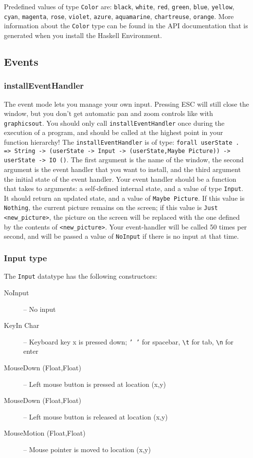 Predefined values of type \texttt{Color} are: \texttt{black}, \texttt{white}, \texttt{red}, \texttt{green}, \texttt{blue}, \texttt{yellow}, \texttt{cyan}, \texttt{magenta}, \texttt{rose}, \texttt{violet}, \texttt{azure}, \texttt{aquamarine}, \texttt{chartreuse}, \texttt{orange}.  
More information about the \texttt{Color} type can be found in the API documentation that is generated when you install the Haskell Environment.

\subsection{Events}
\subsubsection{installEventHandler}
The event mode lets you manage your own input. Pressing ESC will still close the window, but you don't get automatic pan and zoom controls like with \texttt{graphicsout}. You should only call \texttt{installEventHandler} once during the execution of a program, and should be called at the highest point in your function hierarchy! The \texttt{installEventHandler} is of type: \texttt{forall userState . => String -> (userState -> Input -> (userState,Maybe Picture)) -> userState -> IO ()}. The first argument is the name of the window, the second argument is the event handler that you want to install, and the third argument the initial state of the event handler. Your event handler should be a function that takes to arguments: a self-defined internal state, and a value of type \texttt{Input}. It should return an updated state, and a value of \texttt{Maybe Picture}. If this value is \texttt{Nothing}, the current picture remains on the screen; if this value is \verb!Just <new_picture>!, the picture on the screen will be replaced with the one defined by the contents of \verb!<new_picture>!. Your event-handler will be called 50 times per second, and will be passed a value of \texttt{NoInput} if there is no input at that time.

\subsubsection{Input type}
The \texttt{Input} datatype has the following constructors:
\begin{description}
  \item[NoInput] -- No input 
  \item[KeyIn Char] -- Keyboard key x is pressed down; \texttt{' '} for spacebar, \texttt{\textbackslash{}t} for tab, \texttt{\textbackslash{}n} for enter
  \item[MouseDown (Float,Float)] -- Left mouse button is pressed at location (x,y)
  \item[MouseDown (Float,Float)] -- Left mouse button is released at location (x,y)
  \item[MouseMotion (Float,Float)] -- Mouse pointer is moved to location (x,y)
\end{description}


